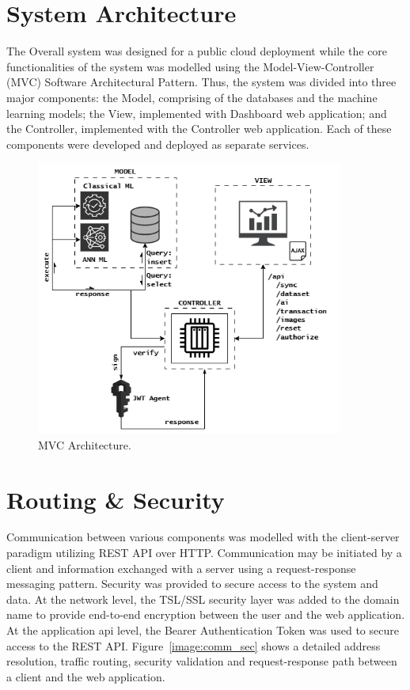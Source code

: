 \section{System Architecture}

The Overall system was designed for a public cloud deployment while the core functionalities of the system was modelled using the
Model-View-Controller (MVC) Software Architectural Pattern. Thus, the system was divided into three major components: the Model, comprising 
of the databases and the machine learning models; the View, implemented with Dashboard web application; and the Controller, implemented with 
the Controller web application. Each of these components were developed and deployed as separate services. 

\begin{figure}[h!]
    \includegraphics[width=0.9\textwidth]{images/mvc_arch.png}
    \caption{MVC Architecture.}
    \label{image:mvc_arch}
\end{figure}

\section{Routing \& Security}
Communication between various components was modelled with the client-server paradigm utilizing REST API over HTTP. Communication may be initiated
by a client and information exchanged with a server using a request-response messaging pattern.  
Security was provided to secure access to the system and data. At the network level, the TSL/SSL security layer was added to the domain name to 
provide end-to-end encryption between the user and the web application. At the application api level, the Bearer Authentication Token was used to 
secure access to the REST API. Figure~\ref{image:comm_sec} shows a detailed address resolution, traffic routing, security validation and 
request-response path between a client and the web application. 


